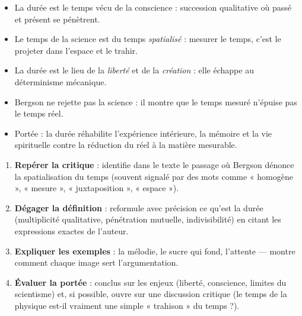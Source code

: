\documentclass[11pt]{article}
\newcommand{\cle}[1]{{\popxbold\color{popdark}#1}}
\begin{document}
\begin{aretenir}
\begin{itemize}
\item La \cle{durée} est le temps vécu de la conscience : succession qualitative où passé et présent se pénètrent.
\item Le temps de la science est du temps \emph{spatialisé} : mesurer le temps, c'est le projeter dans l'espace et le trahir.
\item La durée est le lieu de la \emph{liberté} et de la \emph{création} : elle échappe au déterminisme mécanique.
\item Bergson ne rejette pas la science : il montre que le temps mesuré n'épuise pas le temps réel.
\item Portée : la durée réhabilite l'expérience intérieure, la mémoire et la vie spirituelle contre la réduction du réel à la matière mesurable.
\end{itemize}
\end{aretenir}

\begin{methode}
\begin{enumerate}
\item \textbf{Repérer la critique} : identifie dans le texte le passage où Bergson dénonce la spatialisation du temps (souvent signalé par des mots comme « homogène », « mesure », « juxtaposition », « espace »).
\item \textbf{Dégager la définition} : reformule avec précision ce qu'est la durée (multiplicité qualitative, pénétration mutuelle, indivisibilité) en citant les expressions exactes de l'auteur.
\item \textbf{Expliquer les exemples} : la mélodie, le sucre qui fond, l'attente — montre comment chaque image sert l'argumentation.
\item \textbf{Évaluer la portée} : conclus sur les enjeux (liberté, conscience, limites du scientisme) et, si possible, ouvre sur une discussion critique (le temps de la physique est-il vraiment une simple « trahison » du temps ?).
\end{enumerate}
\end{methode}
\end{document}
